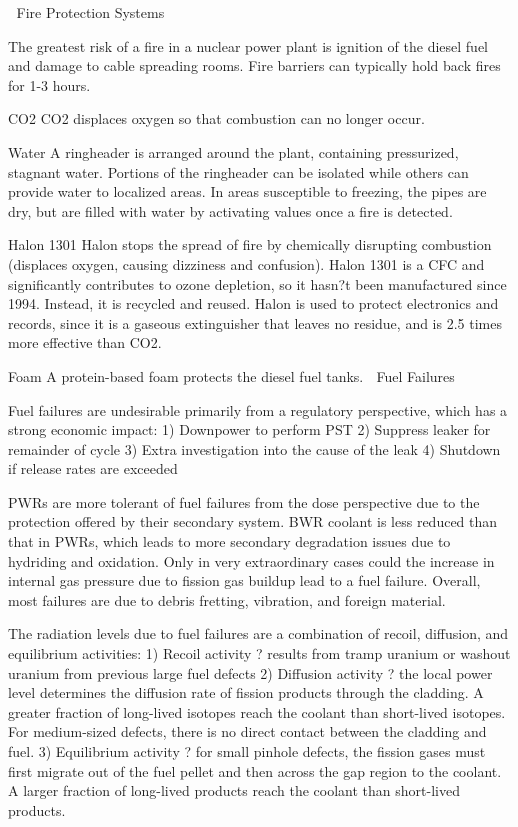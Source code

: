 \documentclass[10pt]{article}
\begin{document}

Fire Protection Systems

The greatest risk of a fire in a nuclear power plant is ignition of the diesel fuel and damage to cable spreading rooms. Fire barriers can typically hold back fires for 1-3 hours. 

CO2
CO2 displaces oxygen so that combustion can no longer occur. 

Water
A ringheader is arranged around the plant, containing pressurized, stagnant water. Portions of the ringheader can be isolated while others can provide water to localized areas. In areas susceptible to freezing, the pipes are dry, but are filled with water by activating values once a fire is detected. 

Halon 1301
Halon stops the spread of fire by chemically disrupting combustion (displaces oxygen, causing dizziness and confusion). Halon 1301 is a CFC and significantly contributes to ozone depletion, so it hasn?t been manufactured since 1994. Instead, it is recycled and reused. Halon is used to protect electronics and records, since it is a gaseous extinguisher that leaves no residue, and is 2.5 times more effective than CO2. 

Foam
A protein-based foam protects the diesel fuel tanks. 

Fuel Failures

Fuel failures are undesirable primarily from a regulatory perspective, which has a strong economic impact:
1)	Downpower to perform PST
2)	Suppress leaker for remainder of cycle
3)	Extra investigation into the cause of the leak
4)	Shutdown if release rates are exceeded

PWRs are more tolerant of fuel failures from the dose perspective due to the protection offered by their secondary system. BWR coolant is less reduced than that in PWRs, which leads to more secondary degradation issues due to hydriding and oxidation. Only in very extraordinary cases could the increase in internal gas pressure due to fission gas buildup lead to a fuel failure. Overall, most failures are due to debris fretting, vibration, and foreign material. 

The radiation levels due to fuel failures are a combination of recoil, diffusion, and equilibrium activities:
1)	Recoil activity ? results from tramp uranium or washout uranium from previous large fuel defects
2)	Diffusion activity ? the local power level determines the diffusion rate of fission products through the cladding. A greater fraction of long-lived isotopes reach the coolant than short-lived isotopes. For medium-sized defects, there is no direct contact between the cladding and fuel.
3)	Equilibrium activity ? for small pinhole defects, the fission gases must first migrate out of the fuel pellet and then across the gap region to the coolant. A larger fraction of long-lived products reach the coolant than short-lived products. 
\end{document}
